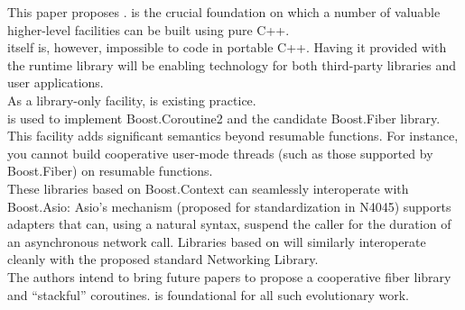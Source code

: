 This paper proposes .  is
the crucial foundation on which a number of valuable higher-level facilities
can be built using pure C++.\\
\newline
{} itself is, however, impossible to code in portable
C++. Having it provided with the runtime library will be enabling technology
for both third-party libraries and user applications.\\
\newline
As a library-only facility,
\cite{bcontext} is existing practice.\\
 is used to implement
Boost.Coroutine2\cite{bcoroutine2} and the candidate Boost.Fiber
library\cite{bfiber}.\\
\newline
This facility adds significant semantics beyond resumable functions. For
instance, you cannot build cooperative user-mode threads (such as those
supported by Boost.Fiber) on resumable functions.\\
\newline
These libraries based on Boost.Context can seamlessly interoperate with
Boost.Asio\cite{basio}: Asio's  mechanism (proposed for
standardization in N4045\cite{N4045}) supports adapters that can, using a
natural syntax, suspend the caller for the duration of an asynchronous network
call. Libraries based on  will similarly
interoperate cleanly with the proposed standard Networking Library\cite{N4478}.\\
\newline
The authors intend to bring future papers to propose a cooperative fiber
library and ``stackful'' coroutines.  is foundational
for all such evolutionary work.
